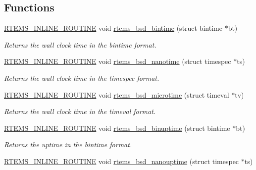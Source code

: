 \subsection*{Functions}
\begin{DoxyCompactItemize}
\item 
\mbox{\hyperlink{group__RTEMSScoreBaseDefs_gac216239df231d5dbd15e3520b0b9313f}{R\+T\+E\+M\+S\+\_\+\+I\+N\+L\+I\+N\+E\+\_\+\+R\+O\+U\+T\+I\+NE}} void \mbox{\hyperlink{group__RTEMSAPIBSD_ga7474fb42d7220f6a3f77a49bebeb58c1}{rtems\+\_\+bsd\+\_\+bintime}} (struct bintime $\ast$bt)
\begin{DoxyCompactList}\small\item\em Returns the wall clock time in the bintime format. \end{DoxyCompactList}\item 
\mbox{\hyperlink{group__RTEMSScoreBaseDefs_gac216239df231d5dbd15e3520b0b9313f}{R\+T\+E\+M\+S\+\_\+\+I\+N\+L\+I\+N\+E\+\_\+\+R\+O\+U\+T\+I\+NE}} void \mbox{\hyperlink{group__RTEMSAPIBSD_ga53f36f715035db077e3d0a75d44d9f75}{rtems\+\_\+bsd\+\_\+nanotime}} (struct timespec $\ast$ts)
\begin{DoxyCompactList}\small\item\em Returns the wall clock time in the timespec format. \end{DoxyCompactList}\item 
\mbox{\hyperlink{group__RTEMSScoreBaseDefs_gac216239df231d5dbd15e3520b0b9313f}{R\+T\+E\+M\+S\+\_\+\+I\+N\+L\+I\+N\+E\+\_\+\+R\+O\+U\+T\+I\+NE}} void \mbox{\hyperlink{group__RTEMSAPIBSD_gabe64cdf3c2b9497f6ba1d9f1d5ce6f23}{rtems\+\_\+bsd\+\_\+microtime}} (struct timeval $\ast$tv)
\begin{DoxyCompactList}\small\item\em Returns the wall clock time in the timeval format. \end{DoxyCompactList}\item 
\mbox{\hyperlink{group__RTEMSScoreBaseDefs_gac216239df231d5dbd15e3520b0b9313f}{R\+T\+E\+M\+S\+\_\+\+I\+N\+L\+I\+N\+E\+\_\+\+R\+O\+U\+T\+I\+NE}} void \mbox{\hyperlink{group__RTEMSAPIBSD_ga2e0ae260b7b2b320d8e5e3cacfbb776d}{rtems\+\_\+bsd\+\_\+binuptime}} (struct bintime $\ast$bt)
\begin{DoxyCompactList}\small\item\em Returns the uptime in the bintime format. \end{DoxyCompactList}\item 
\mbox{\hyperlink{group__RTEMSScoreBaseDefs_gac216239df231d5dbd15e3520b0b9313f}{R\+T\+E\+M\+S\+\_\+\+I\+N\+L\+I\+N\+E\+\_\+\+R\+O\+U\+T\+I\+NE}} void \mbox{\hyperlink{group__RTEMSAPIBSD_gaf300e639d192c219a0a15398ccf515c9}{rtems\+\_\+bsd\+\_\+nanouptime}} (struct timespec $\ast$ts)

\end{DoxyCompactItemize}
